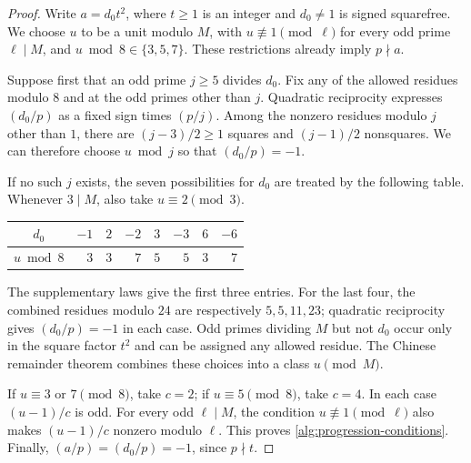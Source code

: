 \begin{proof}
Write $a=d_0t^2$, where $t\ge1$ is an integer and $d_0\ne1$ is signed
squarefree. We choose $u$ to be a unit modulo $M$, with
$u\not\equiv1\pmod\ell$ for every odd prime $\ell\mid M$, and
$u\bmod8\in\{3,5,7\}$. These restrictions already imply $p\nmid a$.

Suppose first that an odd prime $j\ge5$ divides $d_0$. Fix any of the
allowed residues modulo $8$ and at the odd primes other than $j$.
Quadratic reciprocity expresses $(d_0/p)$ as a fixed sign times $(p/j)$.
Among the nonzero residues modulo $j$ other than $1$, there are
$(j-3)/2\ge1$ squares and $(j-1)/2$ nonsquares. We can therefore choose
$u\bmod j$ so that $(d_0/p)=-1$.

If no such $j$ exists, the seven possibilities for $d_0$ are treated by
the following table. Whenever $3\mid M$, also take $u\equiv2\pmod3$.
\begin{center}
\begin{tabular}{c|rrrrrrr}
$d_0$ & $-1$ & $2$ & $-2$ & $3$ & $-3$ & $6$ & $-6$\\ \hline
$u\bmod8$ & $3$ & $3$ & $7$ & $5$ & $5$ & $3$ & $7$
\end{tabular}
\end{center}
The supplementary laws give the first three entries. For the last four,
the combined residues modulo $24$ are respectively $5,5,11,23$;
quadratic reciprocity gives $(d_0/p)=-1$ in each case. Odd primes
dividing $M$ but not $d_0$ occur only in the square factor $t^2$ and can
be assigned any allowed residue. The Chinese remainder theorem combines
these choices into a class $u\pmod M$.

If $u\equiv3$ or $7\pmod8$, take $c=2$; if $u\equiv5\pmod8$, take
$c=4$. In each case $(u-1)/c$ is odd. For every odd $\ell\mid M$,
the condition $u\not\equiv1\pmod\ell$ also makes $(u-1)/c$ nonzero
modulo $\ell$. This proves \eqref{alg:progression-conditions}.
Finally, $(a/p)=(d_0/p)=-1$, since $p\nmid t$.
\end{proof}

